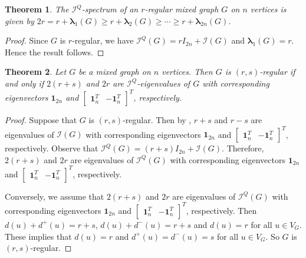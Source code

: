 \documentclass[12pt]{article}
\numberwithin{equation}{section}
\newtheorem{thm}{Theorem}[section]
\begin{document}
	\begin{thm}\label{thm-regular signless spectrum}
		The $\mathcal{I}^Q$-spectrum of an $r$-regular mixed graph $G$ on $n$ vertices is given by $2r=r+\bm{\lambda}_1(G)\geq r+\bm{\lambda}_2(G)\geq\cdots\geq r+\bm{\lambda}_{2n}(G)$.
	\end{thm}
	\begin{proof}
		Since $G$ is $r$-regular, we have $\mathcal{I}^Q(G)=rI_{2n}+\mathcal{I}(G)$ and $\bm{\lambda}_1(G)=r$. Hence the result follows.
	\end{proof}
	
	\begin{thm}
		Let $G$ be a mixed graph on $n$ vertices. Then $G$ is $(r,s)$-regular if and only if $2(r+s)$ and $2r$ are  $\mathcal{I}^Q$-eigenvalues of $G$ with corresponding eigenvectors $\boldsymbol{1}_{2n}$ and $\begin{bmatrix}
			\boldsymbol{1}_n^T&
			-\boldsymbol{1}_n^T
		\end{bmatrix}^T$, respectively.
	\end{thm}
	\begin{proof}
		Suppose that $G$ is $(r,s)$-regular.  Then by
		\cite[Theorem~5.1]{Kalaimatrices1}, $r+s$ and $r-s$ are  eigenvalues of $\mathcal{I}(G)$ with corresponding eigenvectors $\boldsymbol{1}_{2n}$ and $\begin{bmatrix}
		\boldsymbol{1}_n^T&
		-\boldsymbol{1}_n^T
		\end{bmatrix}^T$, respectively. Observe that $\mathcal{I}^Q(G)=(r+s)I_{2n}+\mathcal{I}(G)$. Therefore,  $2(r+s)$ and $2r$ are eigenvalues of $\mathcal{I}^Q(G)$ with corresponding eigenvectors $\boldsymbol{1}_{2n}$ and $\begin{bmatrix}
			\boldsymbol{1}_n^T&
			-\boldsymbol{1}_n^T
		\end{bmatrix}^T$, respectively. 
		
		Conversely, we assume that $2(r+s)$ and $2r$ are  eigenvalues of $\mathcal{I}^Q(G)$ with corresponding eigenvectors $\boldsymbol{1}_{2n}$ and $\begin{bmatrix}
			\boldsymbol{1}_{n}^T&
			-\boldsymbol{1}_n^T
		\end{bmatrix}^T$, respectively. Then $d(u)+d^+(u)=r+s$, $d(u)+d^-(u)=r+s$ and $d(u)=r$ for all $u\in V_G$. These implies that $d(u)=r$ and $d^+(u)=d^-(u)=s$ for all $u\in V_G$. So $G$ is $(r,s)$-regular. 
	\end{proof}
	
	
\end{document}
